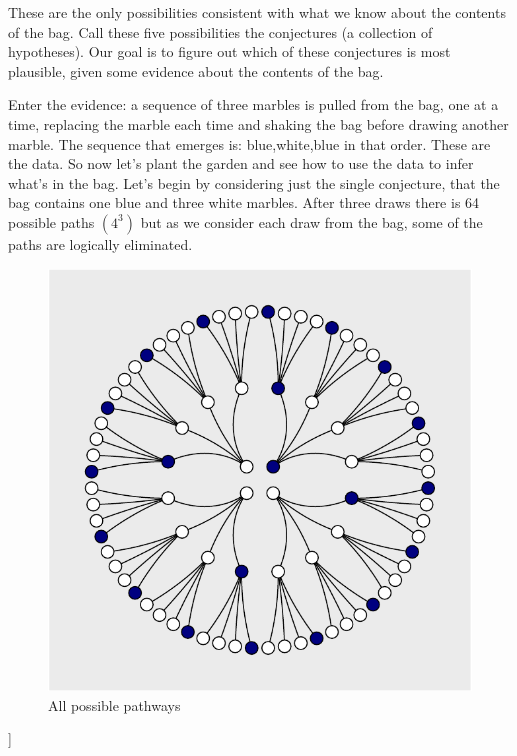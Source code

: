 \documentclass{article}
\begin{document}
These are the only possibilities consistent with what we know about the
contents of the bag. Call these five possibilities the conjectures (a
collection of hypotheses). Our goal is to figure out which of these
conjectures is most plausible, given some evidence about the contents of
the bag.

Enter the evidence: a sequence of three marbles is pulled from the bag,
one at a time, replacing the marble each time and shaking the bag before
drawing another marble. The sequence that emerges is: blue,white,blue in
that order. These are the data. So now let's plant the garden and see
how to use the data to infer what's in the bag. Let's begin by
considering just the single conjecture, that the bag contains one blue
and three white marbles. After three draws there is 64 possible paths
\((4^3)\) but as we consider each draw from the bag, some of the paths
are logically eliminated.

\begin{figure}

{\centering \includegraphics{qrap_paper_files/figure-latex/forking_paths-1} 

}

\caption{All possible pathways}\label{fig:forking_paths}
\end{figure}

{]}
\end{document}
